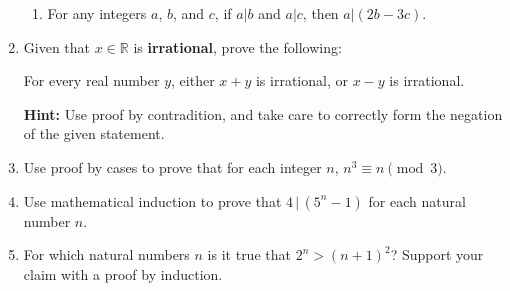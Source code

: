 \documentclass[12pt]{article}
\newcommand{\points}[1]{\marginpar{\hspace{24pt}[#1]}}
\newcommand{\R}{\mathbb{R}}
\begin{document}
\begin{enumerate}
\begin{enumerate}
\item For any integers $a$, $b$, and $c$, if $a|b$ and $a|c$, then $a|(2b-3c)$.\points{4}

\end{enumerate}
\newpage

\item Given that $x\in\R$ is {\bf irrational}, prove the following:   \points{5}
\begin{center}
 For every real number $y$, either $x+y$ is irrational, or $x-y$ is irrational.
\end{center}
{\bf Hint:} Use proof by contradition, and take care to correctly form the negation of the given statement.

\vspace{4in}

\item Use proof by cases to prove that for each integer $n$, $n^3\equiv n \pmod{3}$.\points{5}

\newpage

\item Use mathematical induction to prove that $4\,|\,(5^n-1)$ for each natural number $n$. \points{5}

\vspace{4in}

\item For which natural numbers $n$ is it true that $2^n>(n+1)^2$? Support your claim with a proof by induction. \points{5}
\end{enumerate}
\newpage
\end{document}

